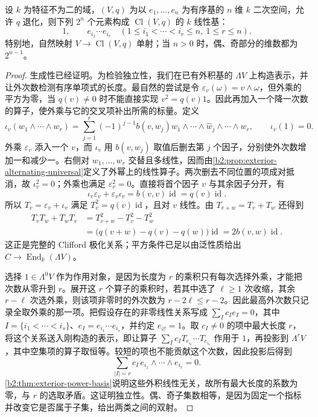 \begin{theorem}\label{b2:thm:B-clifford-basis}
	设 \(k\) 为特征不为二的域，\((V,q)\) 为以 \(e_1,\ldots,e_n\) 为有序基的 \(n\) 维 \(k\) 二次空间，允许 \(q\) 退化，则下列 \(2^n\) 个元素构成 \(\operatorname{Cl}(V,q)\) 的 \(k\) 线性基：
	\[
		1,\qquad e_{i_1}\cdots e_{i_r} \quad(1\le i_1<\cdots<i_r\le n,\ 1\le r\le n).
	\]
	特别地，自然映射 \(V\to\operatorname{Cl}(V,q)\) 单射；当 \(n>0\) 时，偶、奇部分的维数都为 \(2^{n-1}\)。
\end{theorem}
\begin{proof}
	生成性已经证明。为检验独立性，我们在已有外积基的 \(\Lambda V\) 上构造表示，并让外次数检测有序单项式的长度。最自然的尝试是令 \(\varepsilon_v(\omega)=v\wedge\omega\)，但外乘的平方为零，当 \(q(v)\ne0\) 时不能直接实现 \(v^2=q(v)1\)。因此再加入一个降一次数的算子，使外乘与它的交叉项补出所需的标量。定义
	\[
		\iota_v(w_1\wedge\cdots\wedge w_r) =\sum_{j=1}^r(-1)^{j-1}b(v,w_j) w_1\wedge\cdots\wedge\widehat w_j\wedge\cdots\wedge w_r, \qquad\iota_v(1)=0.
	\]
	外乘 \(\varepsilon_v\) 添入一个 \(v\)，而 \(\iota_v\) 用 \(b(v,w_j)\) 取值后删去第 \(j\) 个因子，分别使外次数增加一和减少一。右侧对 \(w_1,\ldots,w_r\) 交替且多线性，因而由\cref{b2:prop:exterior-alternating-universal}定义了外幂上的线性算子。两次删去不同位置的项成对抵消，故 \(\iota_v^2=0\)；外乘也满足 \(\varepsilon_v^2=0\)。直接将首个因子 \(v\) 与其余因子分开，有
	\[
		\iota_v\varepsilon_v+\varepsilon_v\iota_v=b(v,v)\operatorname{id}=q(v)\operatorname{id}.
	\]
	所以 \(T_v=\varepsilon_v+\iota_v\) 满足 \(T_v^2=q(v)\operatorname{id}\)，且对 \(v\) 线性。由 \(T_{v+w}=T_v+T_w\) 还得到
	\[
		\begin{aligned}
			T_vT_w+T_wT_v&=T_{v+w}^2-T_v^2-T_w^2\\
			&=\bigl(q(v+w)-q(v)-q(w)\bigr)\operatorname{id} =2b(v,w)\operatorname{id}.
		\end{aligned}
	\]
	这正是完整的 Clifford 极化关系；平方条件已足以由泛性质给出 \(C\to\operatorname{End}_k(\Lambda V)\)。

	选择 \(1\in\Lambda^0V\) 作为作用对象，是因为长度为 \(r\) 的乘积只有每次选择外乘，才能把次数从零升到 \(r\)。展开这 \(r\) 个算子的乘积时，若其中选了 \(\ell\ge1\) 次收缩，其余 \(r-\ell\) 次选外乘，则该项非零时的外次数为 \(r-2\ell\le r-2\)。因此最高外次数只记录全取外乘的那一项。把假设存在的非零线性关系写成 \(\sum_Ic_Ie_I=0\)，其中 \(I=\{i_1<\cdots<i_s\}\)、\(e_I=e_{i_1}\cdots e_{i_s}\)，并约定 \(e_\varnothing=1\)。取 \(c_I\ne0\) 的项中最大长度 \(r\)，将这个关系送入刚构造的表示，即让算子 \(\sum_I c_I T_{e_{i_1}}\cdots T_{e_{i_s}}\) 作用于 \(1\)，再投影到 \(\Lambda^rV\)，其中空集项的算子取恒等。较短的项也不能贡献这个次数，因此投影后得到
	\[
		\sum_{|I|=r}c_I\,e_{i_1}\wedge\cdots\wedge e_{i_r}=0.
	\]
	\cref{b2:thm:exterior-power-basis}说明这些外积线性无关，故所有最大长度的系数为零，与 \(r\) 的选取矛盾。这证明独立性。偶、奇子集数相等，是因为固定一个指标并改变它是否属于子集，给出两类之间的双射。
\end{proof}

